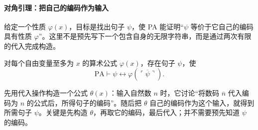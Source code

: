 \documentclass[lang=cn,a4paper,fontset=none,zihao=false,10pt,openany,twoside]{beautybook}
\numberwithin{algorithm}{chapter}
\begin{document}
\paragraph{对角引理：把自己的编码作为输入}
给定一个性质 $\varphi(x)$，目标是找出句子 $\psi$，使 PA 能证明“$\psi$ 等价于它自己的编码具有性质 $\varphi$”。这里不是预先写下一个包含自身的无限字符串，而是通过两次有限的代入完成构造。

\begin{theorem}\label{thm:diagonal-general}
对每个自由变量至多为 $x$ 的算术公式 $\varphi(x)$，存在句子 $\psi$，使
\[
 \mathrm{PA}\vdash\psi\leftrightarrow
 \varphi(\overline{\ulcorner\psi\urcorner}).
\]
\end{theorem}
\begin{remark}[构造思路]
先用代入操作构造一个公式 $\theta(x)$：输入自然数 $n$ 时，它讨论“将数码 $\overline n$ 代入编码为 $n$ 的公式后，所得句子的编码”。随后把 $\theta$ 自己的编码作为这个输入，就得到所需句子 $\psi$。关键是先构造 $\theta$，再取它的编码，最后代入；并不需要预先知道 $\psi$ 的编码。
\end{remark}
\end{document}

